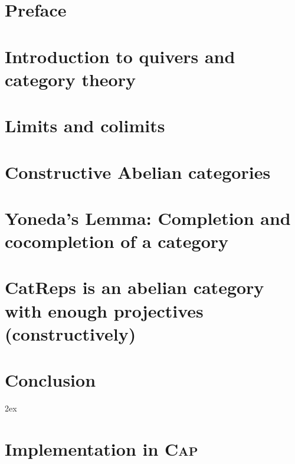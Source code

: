 \documentclass{article}
\begin{document}
\tableofcontents\label{toc}
\section{Preface}

\section{Introduction to quivers and category theory}


\section{Limits and colimits}



\section{Constructive Abelian categories}


%

\section{Yoneda's Lemma: Completion and cocompletion of a category}


\section{CatReps is an abelian category with enough projectives (constructively)}


\section{Conclusion}


\begingroup
     \parindent 0pt
     \parskip 2ex
     \def\enotesize{\normalsize}
     \theendnotes
\endgroup 



\appendix
\renewcommand{\thesection}{\Alph{section}}
\section{Implementation in \textsc{Cap}}

\end{document}
